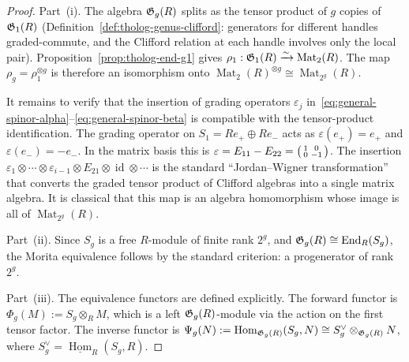 \begin{proof}
Part~(i).
The algebra $\mathfrak{G}_g(R)$ splits as the tensor product of $g$
copies of $\mathfrak{G}_1(R)$ (Definition~\ref{def:tholog-genus-clifford}:
generators for different handles graded-commute, and the
Clifford relation at each handle involves only the
local pair).
Proposition~\ref{prop:tholog-end-g1} gives
$\rho_1 : \mathfrak{G}_1(R) \xrightarrow{\sim} \operatorname{Mat}_2(R)$.
The map $\rho_g = \rho_1^{\otimes g}$ is therefore an
isomorphism onto
$\operatorname{Mat}_2(R)^{\otimes g} \cong \operatorname{Mat}_{2^g}(R)$.

It remains to verify that the insertion of grading operators
$\varepsilon_j$ in~\eqref{eq:general-spinor-alpha}--\eqref{eq:general-spinor-beta}
is compatible with the tensor-product identification.
The grading operator on $S_1 = R e_+ \oplus R e_-$ acts as
$\varepsilon(e_+) = e_+$ and $\varepsilon(e_-) = -e_-$.
In the matrix basis this is
$\varepsilon = E_{11} - E_{22} = \begin{psmallmatrix}1&0\\0&-1\end{psmallmatrix}$.
The insertion
$\varepsilon_1 \otimes \cdots \otimes \varepsilon_{i-1}
\otimes E_{21} \otimes \operatorname{id} \otimes \cdots$
is the standard ``Jordan--Wigner transformation'' that
converts the graded tensor product of Clifford algebras into
a single matrix algebra.
It is classical that this map is an algebra homomorphism whose
image is all of $\operatorname{Mat}_{2^g}(R)$.

Part~(ii).
Since $S_g$ is a free $R$-module of finite rank $2^g$,
and $\mathfrak{G}_g(R) \cong \operatorname{End}_R(S_g)$, the Morita
equivalence follows by the standard criterion:
a progenerator of rank $2^g$.

Part~(iii).
The equivalence functors are defined explicitly.
The forward functor is
$\Phi_g(M) := S_g \otimes_R M$,
which is a left $\mathfrak{G}_g(R)$-module via the action on the
first tensor factor.
The inverse functor is
$\Psi_g(N) := \operatorname{Hom}_{\mathfrak{G}_g(R)}(S_g, N)
\cong S_g^\vee \otimes_{\mathfrak{G}_g(R)} N$,
where $S_g^\vee = \underline{\operatorname{Hom}}_R(S_g, R)$.


\end{proof}
